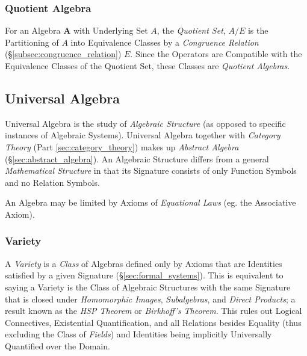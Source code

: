 \documentclass{article}
\begin{document}
\subsubsection{Quotient Algebra}\label{subsec:quotient_algebra}

For an Algebra $\mathbf{A}$ with Underlying Set $A$, the
\emph{Quotient Set}, $A / E$ is the Partitioning of $A$ into
Equivalence Classes by a \emph{Congruence Relation}
(\S\ref{subsec:congruence_relation}) $E$. Since the Operators are
Compatible with the Equivalence Classes of the Quotient Set, these
Classes are \emph{Quotient Algebras}.

\subsection{Universal Algebra}\label{subsec:universal_algebra}

Universal Algebra is the study of \emph{Algebraic Structure} (as
opposed to specific instances of Algebraic Systems). Universal Algebra
together with \emph{Category Theory} (Part \ref{sec:category_theory})
makes up \emph{Abstract Algebra} (\S\ref{sec:abstract_algebra}). An
Algebraic Structure differs from a general \emph{Mathematical
  Structure} in that its Signature consists of only Function Symbols
and no Relation Symbols.

An Algebra may be limited by Axioms of \emph{Equational Laws} (eg. the
Associative Axiom).



\subsubsection{Variety}\label{subsec:model_variety}

A \emph{Variety} is a \emph{Class} of Algebras defined only by Axioms
that are Identities satisfied by a given Signature
(\S\ref{sec:formal_systems}). This is equivalent to saying a Variety
is the Class of Algebraic Structures with the same Signature that is
closed under \emph{Homomorphic Images}, \emph{Subalgebras}, and
\emph{Direct Products}; a result known as the \emph{HSP Theorem} or
\emph{Birkhoff's Theorem}\cite{birkhoff35}. This rules out Logical
Connectives, Existential Quantification, and all Relations besides
Equality (thus excluding the Class of \emph{Fields}) and Identities
being implicitly Universally Quantified over the Domain.
\end{document}

